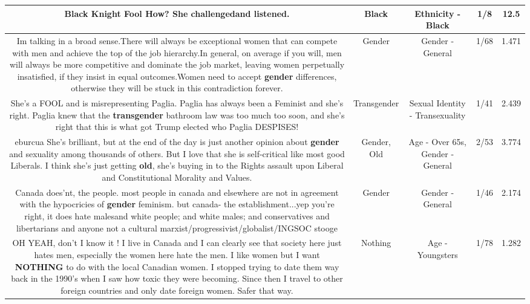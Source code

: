 \documentclass[11pt]{article}
\newlength\mylength
\begin{document}
\begin{center}
\begin{longtable}{|C{.65\mylength}|C{.30\mylength}|C{.12\mylength}|C{.12\mylength}|C{.12\mylength}|}
  \small Black Knight Fool How? She challenged​ and listened.\normalsize   & Black & Ethnicity - Black & 1/8 & 12.5 \\  \hline
  \small Im talking in a broad sense.There will always be exceptional women that can compete with men and achieve the top of the job hierarchy.In general, on average if you will, men will always be more competitive and dominate the job market, leaving women perpetually insatisfied, if they insist in equal outcomes.Women need to accept \textbf{gender} differences, otherwise they will be stuck in this contradiction forever.\normalsize   & Gender & Gender - General & 1/68 & 1.471 \\  \hline
  \small She's a FOOL and is misrepresenting Paglia. Paglia has always been a Feminist and she's right. Paglia knew that the \textbf{transgender} bathroom law was too much too soon, and she's right that this is what got Trump elected who Paglia DESPISES!\normalsize   & Transgender & Sexual Identity - Transexuality & 1/41 & 2.439 \\  \hline
  \small eburcua She's brilliant, but at the end of the day is just another opinion about \textbf{gender} and sexuality among thousands of others. But I love that she is self-critical like most good Liberals. I think she's just getting \textbf{old}, she's buying in to the Rights assault upon Liberal and Constitutional Morality and Values.\normalsize   & Gender, Old & Age - Over 65s, Gender - General & 2/53 & 3.774 \\  \hline
  \small Canada does'nt, the people. most people in canada and elsewhere are not in agreement with the hypocricies of \textbf{gender} feminism. but canada- the establishment...yep you're right, it does hate males{and white people; and white males; and conservatives and libertarians and anyone not a cultural marxist/progressivist/globalist/INGSOC stooge}\normalsize   & Gender & Gender - General & 1/46 & 2.174 \\  \hline
  \small OH YEAH, don't I know it !    I live in Canada and I can clearly see that society here just hates men, especially the women here hate the men.   I like women but I want \textbf{NOTHING} to do with the local Canadian women. I stopped trying to date them way back in the 1990's when I saw how toxic they were becoming.  Since then I travel to other foreign countries and only date foreign women.  Safer that way.\normalsize   & Nothing & Age - Youngsters & 1/78 & 1.282 \\  \hline

\end{longtable}
\end{center}
\end{document}
